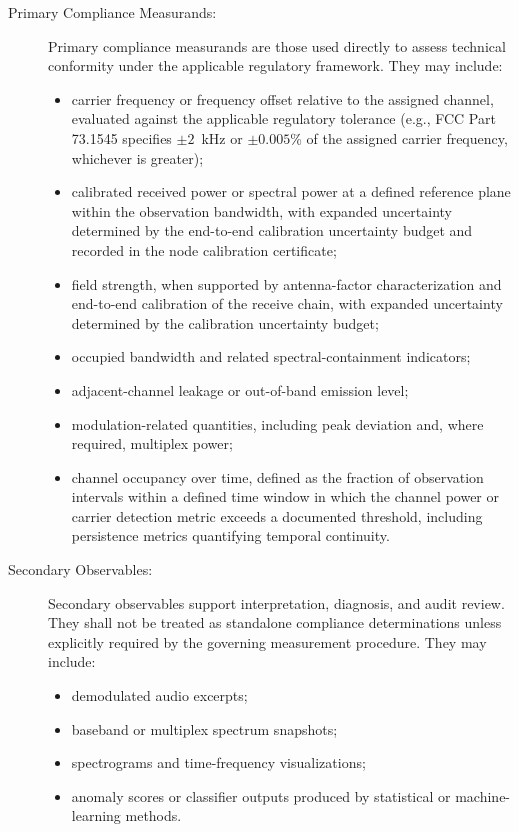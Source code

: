 \documentclass[11pt]{report}
\begin{document}
\begin{description}
	
	\item[Primary Compliance Measurands:]
	Primary compliance measurands are those used directly to assess technical conformity under the applicable regulatory framework. They may include:
	\begin{itemize}
		\item carrier frequency or frequency offset relative to the assigned channel, evaluated against the applicable regulatory tolerance (e.g., FCC Part 73.1545 specifies $\pm2$~kHz or $\pm0.005$\% of the assigned carrier frequency, whichever is greater);
		\item calibrated received power or spectral power at a defined reference plane within the observation bandwidth, with expanded uncertainty determined by the end-to-end calibration uncertainty budget and recorded in the node calibration certificate;
		\item field strength, when supported by antenna-factor characterization and end-to-end calibration of the receive chain, with expanded uncertainty determined by the calibration uncertainty budget;
		\item occupied bandwidth and related spectral-containment indicators;
		\item adjacent-channel leakage or out-of-band emission level;
		\item modulation-related quantities, including peak deviation and, where required, multiplex power;
		\item channel occupancy over time, defined as the fraction of observation intervals within a defined time window in which the channel power or carrier detection metric exceeds a documented threshold, including persistence metrics quantifying temporal continuity.
	\end{itemize}
	
	\item[Secondary Observables:]
	Secondary observables support interpretation, diagnosis, and audit review. They shall not be treated as standalone compliance determinations unless explicitly required by the governing measurement procedure. They may include:
	\begin{itemize}
		\item demodulated audio excerpts;
		\item baseband or multiplex spectrum snapshots;
		\item spectrograms and time-frequency visualizations;
		\item anomaly scores or classifier outputs produced by statistical or machine-learning methods.
	\end{itemize}
	

\end{description}
\end{document}
